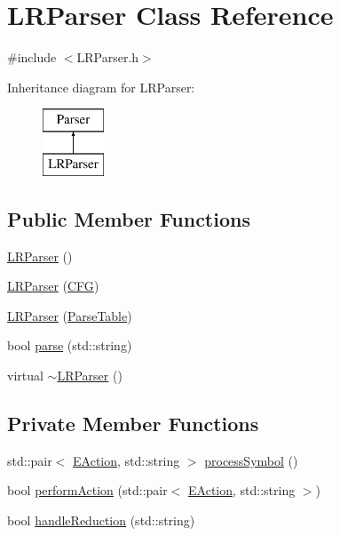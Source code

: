 \hypertarget{classLRParser}{\section{\-L\-R\-Parser \-Class \-Reference}
\label{d6/de9/classLRParser}
}


{\ttfamily \#include $<$\-L\-R\-Parser.\-h$>$}

\-Inheritance diagram for \-L\-R\-Parser\-:\begin{figure}[H]
\begin{center}
\leavevmode
\includegraphics[height=2.000000cm]{d6/de9/classLRParser}
\end{center}
\end{figure}
\subsection*{\-Public \-Member \-Functions}
\begin{DoxyCompactItemize}
\item 
\hyperlink{classLRParser_adf2fe54095f02900d06389007a1e5f53}{\-L\-R\-Parser} ()
\item 
\hyperlink{classLRParser_abee4e9919e49f66051167487fb467601}{\-L\-R\-Parser} (\hyperlink{classCFG}{\-C\-F\-G})
\item 
\hyperlink{classLRParser_a52727298bd32f6b4ac91d2e1351ffe49}{\-L\-R\-Parser} (\hyperlink{classParseTable}{\-Parse\-Table})
\item 
bool \hyperlink{classLRParser_a0657ab1ec68beb8fce3756f7204079b4}{parse} (std\-::string)
\item 
virtual \hyperlink{classLRParser_a85b1487a331f1a617ee74965264fcf8f}{$\sim$\-L\-R\-Parser} ()
\end{DoxyCompactItemize}
\subsection*{\-Private \-Member \-Functions}
\begin{DoxyCompactItemize}
\item 
std\-::pair$<$ \hyperlink{ParseTable_8h_a81d4868b129e5f45325894085a36a8a5}{\-E\-Action}, std\-::string $>$ \hyperlink{classLRParser_a3bd6bff5276c4ee9b592a14e31e789b3}{process\-Symbol} ()
\item 
bool \hyperlink{classLRParser_aa2a11e0af8cbc1bb23b522f1a2ca87e5}{perform\-Action} (std\-::pair$<$ \hyperlink{ParseTable_8h_a81d4868b129e5f45325894085a36a8a5}{\-E\-Action}, std\-::string $>$)
\item 
bool \hyperlink{classLRParser_ab355d762edcb2c7da1f30728d08b43a1}{handle\-Reduction} (std\-::string)
\end{DoxyCompactItemize}
